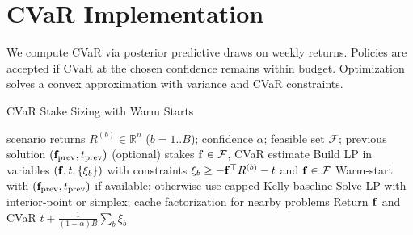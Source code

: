 \section{CVaR Implementation}
We compute CVaR via posterior predictive draws on weekly returns. Policies are accepted if CVaR at the chosen confidence remains within budget. Optimization solves a convex approximation with variance and CVaR constraints.

\begin{algorithm}[t]
  \caption{CVaR Stake Sizing with Warm Starts}
  \label{alg:cvar-solve}
  \begin{algorithmic}[1]
    \Require scenario returns $R^{(b)}\in\mathbb{R}^n$ ($b=1..B$); confidence $\alpha$; feasible set $\mathcal F$; previous solution $(\mathbf{f}_{\text{prev}},t_{\text{prev}})$ (optional)
    \Ensure stakes $\mathbf{f}\in\mathcal F$, CVaR estimate
    \State Build LP in variables $(\mathbf{f},t,\{\xi_b\})$ with constraints $\xi_b\ge-\mathbf{f}^\top R^{(b)}-t$ and $\mathbf{f}\in\mathcal F$
    \State Warm‑start with $(\mathbf{f}_{\text{prev}},t_{\text{prev}})$ if available; otherwise use capped Kelly baseline
    \State Solve LP with interior‑point or simplex; cache factorization for nearby problems
    \State Return $\mathbf{f}$ and CVaR $t+\frac{1}{(1-\alpha)B}\sum_b \xi_b$
  \end{algorithmic}
\end{algorithm}
